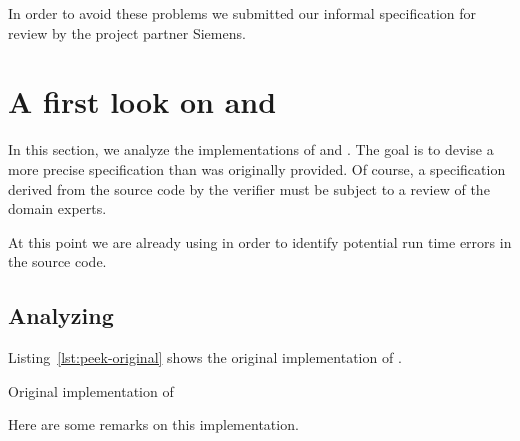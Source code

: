 In order to avoid these problems we submitted our informal specification
for review by the project partner Siemens.

\clearpage

\section{A first look on \peek and \poke}
\label{sec:bitwalker-first-look}

In this section, we analyze the implementations of \peek 
and \poke.
The goal is to devise a more precise specification than
was originally provided.
Of course, a specification derived from the source code by the verifier
must be subject to a review of the domain experts.

At this point we are already using \framacwp in order to identify
potential run time errors in the source code.

\subsection{Analyzing \peek}
\label{sec:bitwalker-peek-first-look}

Listing~\ref{lst:peek-original} shows the original implementation of \peek.


\begin{listing}[hbt]
\begin{minipage}{\textwidth}

\end{minipage}
\caption{\label{lst:peek-original} Original implementation of \peek}
\end{listing}

Here are some remarks on this implementation.


